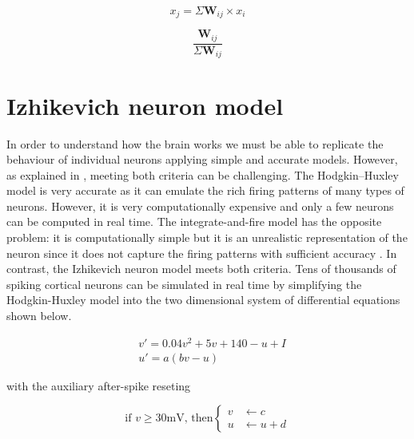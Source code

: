 \begin{equation}\label{eq:synaptic_effectivity}
x_{j} = \Sigma \textbf{W}_{ij}\times x_{i}
\end{equation}

\begin{equation}\label{eq:synaptic_contribution}
\frac{\textbf{W}_{ij}}{\Sigma \textbf{W}_{ij}}
\end{equation}

\section{Izhikevich neuron model}\label{sec:izhikevich_neuron_model}

In order to understand how the brain works we must be able to replicate the behaviour of individual neurons applying simple and accurate models. However, as explained in \cite{izhikevich2003simple}, meeting both criteria can be challenging. The Hodgkin–Huxley model \cite{hodgkin1952quantitative} is very accurate as it can emulate the rich firing patterns of many types of neurons. However, it is very computationally expensive and only a few neurons can be computed in real time. The integrate-and-fire model \cite{burkitt2006review}  has the opposite problem: it is computationally simple but it is an unrealistic representation of the neuron since it does not capture the firing patterns with sufficient accuracy \cite{izhikevich2003simple}. In contrast, the Izhikevich neuron model \cite{izhikevich2003simple} meets both criteria. Tens of thousands of spiking cortical neurons can be simulated in real time by simplifying the Hodgkin-Huxley model into the two dimensional system of differential equations shown below.


\begin{align}\label{eq:izhikevich_ode}
&v'=0.04v^{2}+5v+140-u+I \\
&u'=a(bv-u)
\end{align}

with the auxiliary after-spike reseting

\begin{equation}\label{eq:izhikevich_reset}
\text{if } v \geq 30 \text{mV, then}
\begin{cases}
    v     & \leftarrow c \\
    u     & \leftarrow u + d 
  \end{cases}
\end{equation}


